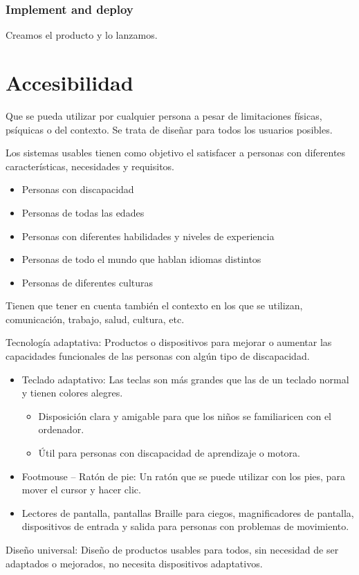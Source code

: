 \documentclass[12pt, twoside, openright]{report} %
\begin{document}
\subsubsection{Implement and deploy}
Creamos el producto y lo lanzamos.

  
\pagebreak
\section{Accesibilidad}
  Que se pueda utilizar por cualquier persona a pesar de limitaciones
  físicas, psíquicas o del contexto. Se trata de diseñar para todos los
  usuarios posibles.

  Los sistemas usables tienen como objetivo el satisfacer a personas con
  diferentes características, necesidades y requisitos.

  \begin{itemize}
  
  \item
    Personas con discapacidad
  \item
    Personas de todas las edades
  \item
    Personas con diferentes habilidades y niveles de experiencia
  \item
    Personas de todo el mundo que hablan idiomas distintos
  \item
    Personas de diferentes culturas
  \end{itemize}

  Tienen que tener en cuenta también el contexto en los que se utilizan,
  comunicación, trabajo, salud, cultura, etc.

  Tecnología adaptativa: Productos o dispositivos para mejorar o
  aumentar las capacidades funcionales de las personas con algún tipo de
  discapacidad.

  \begin{itemize}
  
  \item
    Teclado adaptativo: Las teclas son más grandes que las de un teclado
    normal y tienen colores alegres.

    \begin{itemize}
    
    \item
      Disposición clara y amigable para que los niños se familiaricen
      con el ordenador.
    \item
      Útil para personas con discapacidad de aprendizaje o motora.
    \end{itemize}
  \item
    Footmouse -- Ratón de pie: Un ratón que se puede utilizar con los
    pies, para mover el cursor y hacer clic.
  \item
    Lectores de pantalla, pantallas Braille para ciegos, magnificadores
    de pantalla, dispositivos de entrada y salida para personas con
    problemas de movimiento.
  \end{itemize}
\pagebreak
  Diseño universal: Diseño de productos usables para todos, sin
  necesidad de ser adaptados o mejorados, no necesita dispositivos
  adaptativos.
\end{document}
